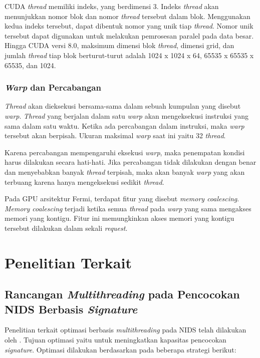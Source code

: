       CUDA \emph{thread} memiliki indeks, yang berdimensi 3. Indeks \emph{thread} akan menunjukkan nomor blok dan nomor \emph{thread} tersebut dalam blok. Menggunakan kedua indeks tersebut, dapat dibentuk nomor yang unik tiap \emph{thread}. Nomor unik tersebut dapat digunakan untuk melakukan pemrosesan paralel pada data besar. Hingga CUDA versi 8.0, maksimum dimensi blok \emph{thread}, dimensi grid, dan jumlah \emph{thread} tiap blok berturut-turut adalah 1024 x 1024 x 64, 65535 x 65535 x 65535, dan 1024.


    \subsubsection{\emph{Warp} dan Percabangan}

      \emph{Thread} akan dieksekusi bersama-sama dalam sebuah kumpulan yang disebut \emph{warp}. \emph{Thread} yang berjalan dalam satu \emph{warp} akan mengeksekusi instruksi yang sama dalam satu waktu. Ketika ada percabangan dalam instruksi, maka \emph{warp} tersebut akan berpisah. Ukuran maksimal \emph{warp} saat ini yaitu 32 \emph{thread}.

      Karena percabangan mempengaruhi eksekusi \emph{warp}, maka penempatan kondisi harus dilakukan secara hati-hati. Jika percabangan tidak dilakukan dengan benar dan menyebabkan banyak \emph{thread} terpisah, maka akan banyak \emph{warp} yang akan terbuang karena hanya mengeksekusi sedikit \emph{thread}.
      
      Pada GPU arsitektur Fermi, terdapat fitur yang disebut \emph{memory coalescing}. \emph{Memory coalescing} terjadi ketika semua \emph{thread} pada \emph{warp} yang sama mengakses memori yang kontigu. Fitur ini memungkinkan akses memori yang kontigu tersebut dilakukan dalam sekali \emph{request}.

\section{Penelitian Terkait}

  \subsection{Rancangan \emph{Multithreading} pada Pencocokan NIDS Berbasis \emph{Signature}} 

    Penelitian terkait optimasi berbasis \emph{multithreading} pada NIDS telah dilakukan oleh \cite{multi2004}. Tujuan optimasi yaitu untuk meningkatkan kapasitas pencocokan \emph{signature}. Optimasi dilakukan berdasarkan pada beberapa strategi berikut:

